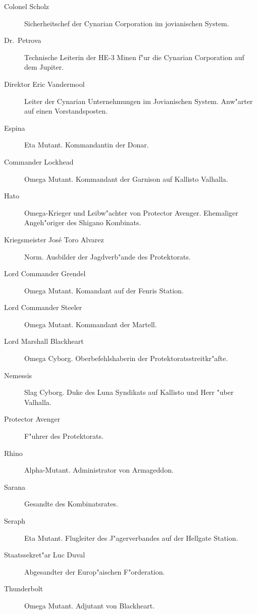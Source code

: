 
\begin{description}
\item [Colonel Scholz] Sicherheitschef der Cynarian Corporation im jovianischen System.
\item [Dr.~Petrova] Technische Leiterin der HE-3 Minen f"ur die Cynarian Corporation auf dem Jupiter.
\item [Direktor Eric Vandermool] Leiter der Cynarian Unternehmungen im Jovianischen System. Anw"arter auf einen
      Vorstandsposten.
\item [Espina] Eta Mutant. Kommandantin der Donar.
\item [Commander Lockhead] Omega Mutant. Kommandant der Garnison auf Kallisto Valhalla.
\item [Hato] Omega-Krieger und Leibw"achter von Protector Avenger. Ehemaliger Angeh"origer des Shigano Kombinats.
\item [Kriegsmeister Jos\'{e} \frqq{}Toro\flqq{} Alvarez] Norm. Ausbilder der Jagdverb"ande des Protektorats.
\item [Lord Commander Grendel] Omega Mutant. Komandant auf der Fenris Station.
\item [Lord Commander Steeler] Omega Mutant. Kommandant der Martell.
\item [Lord Marshall Blackheart] Omega Cyborg. Oberbefehlshaberin der Protektoratsstreitkr"afte.
\item [Nemessis] Slag Cyborg. Duke des Luna Syndikats auf Kallisto und Herr "uber Valhalla.
\item [Protector Avenger] F"uhrer des Protektorats.
\item [Rhino] Alpha-Mutant. Administrator von Armageddon.
\item [Sarana] Gesandte des Kombinatsrates.
\item [Seraph] Eta Mutant. Flugleiter des J"agerverbandes auf der Hellgate Station.
\item [Staatssekret"ar Luc Duval] Abgesandter der Europ"aischen F"orderation.
\item [Thunderbolt] Omega Mutant. Adjutant von Blackheart.
\end{description}
